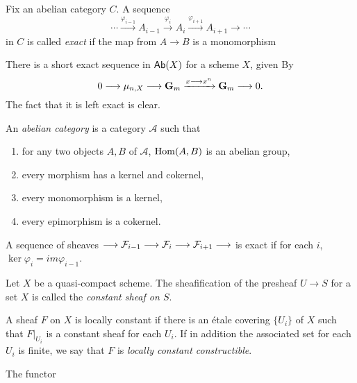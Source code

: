 \begin{definition}
	Fix an abelian category $C$.  A sequence
	\[ \cdots \xrightarrow{\varphi_{i-1}} A_{i-1} \xrightarrow{\varphi_{i}} A_{i} \xrightarrow{\varphi_{i+1}} A_{i+1} \to \cdots\]
	in $C$ is called \textit{exact} if the map from $A \to B$ is a monomorphism
\end{definition}

\begin{example}
	There is a short exact sequence in $\mathsf{Ab}(X)$ for a scheme $X$, given By
	\[
		0 \longrightarrow \mu_{n,X} \longrightarrow \mathbf{G}_m \xrightarrow{x \longrightarrow x^n} \mathbf{G}_m \longrightarrow 0.
	\]
	The fact that it is left exact is clear.
\end{example}

\begin{remark}
	An \textit{abelian category} is a category $\mathcal{A}$ such that
	\begin{enumerate}
		\item for any two objects $A,B$ of $\mathcal{A}$, $\operatorname{Hom}(A,B)$ is an abelian group,
		\item every morphism has a kernel and cokernel,
		\item every monomorphism is a kernel,
		\item every epimorphism is a cokernel.
	\end{enumerate}
\end{remark}

\begin{definition}
	A sequence of sheaves $\longrightarrow \mathcal{F}_{i-1} \longrightarrow \mathcal{F}_{i} \longrightarrow \mathcal{F}_{i+1} \longrightarrow$
	is exact if for each $i$, $\ker \varphi_i = im \varphi_{i-1}$.
\end{definition}

\begin{definition}
	Let $X$ be a quasi-compact scheme. The sheafification of the presheaf $U \to S$ for a set $X$ is called the \textit{constant sheaf on $S$}.
\end{definition}

\begin{definition}
	A sheaf $F$ on $X$ is locally constant if there is an \'etale covering $\{U_i\}$ of $X$ such that $F|_{U_i}$ is a constant sheaf for each $U_i$. If in addition the associated set for each $U_i$ is finite, we say that $F$ is \textit{locally constant constructible}.
\end{definition}

\begin{theorem}
	The functor
\end{theorem}

